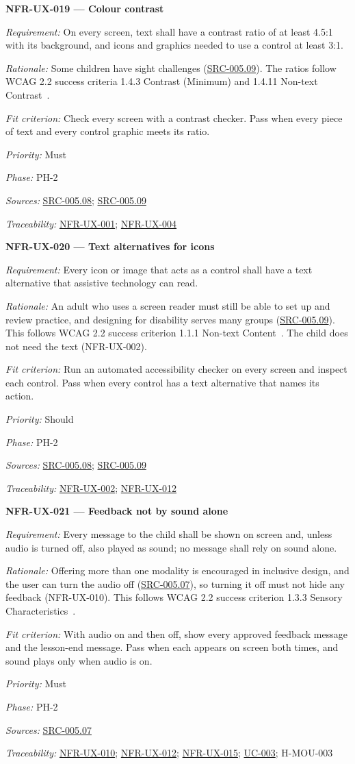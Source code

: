 \documentclass[12pt]{article}
\renewcommand{\_}{\textunderscore\allowbreak}%
\newcommand{\ucref}[1]{\hyperref[uc:#1]{\mbox{UC-#1}}}
\newenvironment{srsrequirement}[2]{%
  \par\medskip\noindent\phantomsection\label{req:#1}%
  \textbf{#1 --- #2}\par\nobreak\smallskip }{\par\medskip}
\newcommand{\reqfield}[2]{\noindent\textit{#1:} #2\par}
\newcommand{\reqshall}[1]{\reqfield{Requirement}{#1}}
\newcommand{\reqrationale}[1]{\reqfield{Rationale}{#1}}
\newcommand{\reqfit}[1]{\reqfield{Fit criterion}{#1}}
\newcommand{\reqpriority}[1]{\reqfield{Priority}{#1}}
\newcommand{\reqphase}[1]{\reqfield{Phase}{#1}}
\newcommand{\reqsources}[1]{\reqfield{Sources}{#1}}
\newcommand{\reqtraces}[1]{\reqfield{Traceability}{#1}}
\newcommand{\reqref}[1]{\hyperref[req:#1]{#1}}
\newcommand{\srcref}[1]{\hyperref[src:#1]{SRC-#1}}
\providecommand{\ucref}[1]{\hyperref[uc:#1]{UC-#1}}
\begin{document}
\begin{srsrequirement}{NFR-UX-019}{Colour contrast}
  \reqshall{On every screen, text shall have a contrast ratio of at least 4.5:1
with its background, and icons and graphics needed to use a control at least
3:1.} \reqrationale{Some children have sight challenges (\srcref{005.09}). The
ratios follow WCAG 2.2 success criteria 1.4.3 Contrast (Minimum) and 1.4.11
Non-text Contrast~\cite{wcag22}.} \reqfit{Check every screen with a contrast
checker. Pass when every piece of text and every control graphic meets its
ratio.}
  \reqpriority{Must}
  \reqphase{PH-2}
  \reqsources{\srcref{005.08}; \srcref{005.09}} \reqtraces{\reqref{NFR-UX-001};
  \reqref{NFR-UX-004}}
\end{srsrequirement}

\begin{srsrequirement}{NFR-UX-020}{Text alternatives for icons}
  \reqshall{Every icon or image that acts as a control shall have a text
alternative that assistive technology can read.} \reqrationale{An adult who uses
a screen reader must still be able to set up and review practice, and designing
for disability serves many groups (\srcref{005.09}). This follows WCAG 2.2
success criterion 1.1.1 Non-text Content~\cite{wcag22}. The child does not need
the text (NFR-UX-002).} \reqfit{Run an automated accessibility checker on every
screen and inspect each control. Pass when every control has a text alternative
that names its action.}
  \reqpriority{Should}
  \reqphase{PH-2}
  \reqsources{\srcref{005.08}; \srcref{005.09}} \reqtraces{\reqref{NFR-UX-002};
  \reqref{NFR-UX-012}}
\end{srsrequirement}

\begin{srsrequirement}{NFR-UX-021}{Feedback not by sound alone}
  \reqshall{Every message to the child shall be shown on screen and, unless
audio is turned off, also played as sound; no message shall rely on sound
alone.} \reqrationale{Offering more than one modality is encouraged in inclusive
design, and the user can turn the audio off (\srcref{005.07}), so turning it off
must not hide any feedback (NFR-UX-010). This follows WCAG 2.2 success criterion
1.3.3 Sensory Characteristics~\cite{wcag22}.} \reqfit{With audio on and then
off, show every approved feedback message and the lesson-end message. Pass when
each appears on screen both times, and sound plays only when audio is on.}
  \reqpriority{Must}
  \reqphase{PH-2}
  \reqsources{\srcref{005.07}} \reqtraces{\reqref{NFR-UX-010};
  \reqref{NFR-UX-012}; \reqref{NFR-UX-015}; \ucref{003}; H-MOU-003}
\end{srsrequirement}
\end{document}
